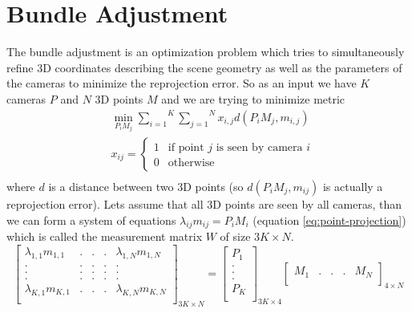 \section{Bundle Adjustment}
\label{sec:bundle-adjustment}
The bundle adjustment is an optimization problem which tries to simultaneously refine 3D coordinates describing the scene geometry as well as the parameters of the cameras to minimize the reprojection error. So as an input we have $K$ cameras $P$ and $N$ 3D points $M$ and we are trying to minimize metric
\begin{equation}
  \begin{aligned}
	&\underset{P_i M_j}{\min} \overset{K}{\underset{i=1}{\sum}} \overset{N}{\underset{j=1}{\sum}} x_{i,j} d(P_i M_j ,m_{i,j}) \\
	& x_{ij} = 
	\begin{cases}
		1 & \text{if point } j \text{ is seen by camera } i \\
		0 & \text{otherwise}
	\end{cases} \\
	\end{aligned}
	\label{eq:bundle-adjustment}
\end{equation}
where $d$ is a distance between two 3D points (so $d(P_i M_j ,m_{ij})$ is actually a reprojection error). Lets assume that all 3D points are seen by all cameras, than we can form a system of equations $\lambda_{ij} m_{ij} = P_i M_i$ (equation \ref{eq:point-projection}) which is called the measurement matrix $W$ of size $3K \times N$.
\begin{equation}
	\begin{bmatrix}
		\lambda_{1,1} m_{1,1} & . & . & . & \lambda_{1,N} m_{1,N} \\
		. & . & . & . &. \\
		. & . & . & . &. \\
		. & . & . & . &. \\
		\lambda_{K,1} m_{K,1} & . & . & . & \lambda_{K,N} m_{K,N} \\
	\end{bmatrix}_{3K \times N}
	= 
	\begin{bmatrix}
		P_{1} \\
		. \\
		. \\
		. \\
		P_{K} \\
	\end{bmatrix}_{3K \times 4}
	\begin{bmatrix}
		M_{1} & . & . & . & M_{N} \\
	\end{bmatrix}_{4 \times N}
\end{equation}
